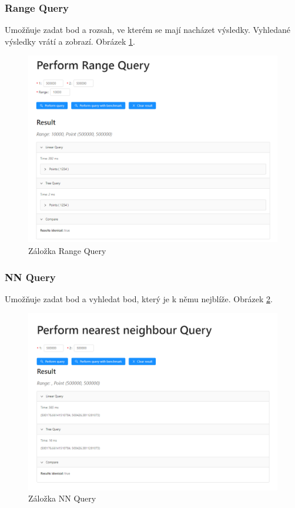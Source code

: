 \documentclass[a4paper,10pt]{article}
\begin{document}
\subsubsection*{Range Query}
Umožňuje zadat bod a rozsah, ve kterém se mají nacházet výsledky. Vyhledané výsledky vrátí a zobrazí. Obrázek \ref{fig:rangeq}.
\begin{figure}
    \includegraphics[width=\textwidth]{RangeQuery.png}
    \caption{Záložka Range Query}
    \label{fig:rangeq}
\end{figure}
\subsubsection*{NN Query}
Umožňuje zadat bod a vyhledat bod, který je k němu nejblíže. Obrázek \ref{fig:nnq}.
\begin{figure}
    \includegraphics[width=\textwidth]{NNQuery.png}
    \caption{Záložka NN Query}
    \label{fig:nnq}
\end{figure}
\end{document}
